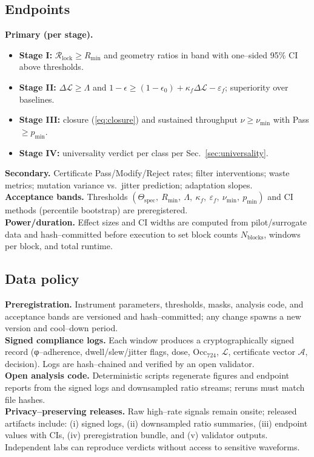 \documentclass[11pt]{article}
\begin{document}
\subsection{Endpoints}\label{sec:endpoints}
\textbf{Primary (per stage).}
\begin{itemize}
\item \textbf{Stage I:} $\mathcal{R}_{\mathrm{lock}}\ge R_{\min}$ and geometry ratios in band with one--sided 95\% CI above thresholds.
\item \textbf{Stage II:} $\Delta\mathcal{L}\ge\Lambda$ and $1-\epsilon\ge(1-\epsilon_0)+\kappa_f\Delta\mathcal{L}-\varepsilon_f$; superiority over baselines.
\item \textbf{Stage III:} closure (\eqref{eq:closure}) and sustained throughput $\nu\ge\nu_{\min}$ with \textsf{Pass}$\ge p_{\min}$.
\item \textbf{Stage IV:} universality verdict per class per Sec.~\ref{sec:universality}.
\end{itemize}
\textbf{Secondary.} Certificate \textsf{Pass/Modify/Reject} rates; filter interventions; waste metrics; mutation variance vs.\ jitter prediction; adaptation slopes.\\
\textbf{Acceptance bands.} Thresholds $(\Theta_{\mathrm{spec}},\ R_{\min},\ \Lambda,\ \kappa_f,\ \varepsilon_f,\ \nu_{\min},\ p_{\min})$ and CI methods (percentile bootstrap) are preregistered.\\
\textbf{Power/duration.} Effect sizes and CI widths are computed from pilot/surrogate data and hash--committed before execution to set block counts $N_{\mathrm{blocks}}$, windows per block, and total runtime.

\subsection{Data policy}\label{sec:datapolicy}
\textbf{Preregistration.} Instrument parameters, thresholds, masks, analysis code, and acceptance bands are versioned and hash--committed; any change spawns a new version and cool--down period.\\
\textbf{Signed compliance logs.} Each window produces a cryptographically signed record (φ–adherence, dwell/slew/jitter flags, dose, $\mathrm{Occ}_{724}$, $\mathcal{L}$, certificate vector $\mathcal{A}$, decision). Logs are hash--chained and verified by an open validator.\\
\textbf{Open analysis code.} Deterministic scripts regenerate figures and endpoint reports from the signed logs and downsampled ratio streams; reruns must match file hashes.\\
\textbf{Privacy--preserving releases.} Raw high--rate signals remain onsite; released artifacts include: (i) signed logs, (ii) downsampled ratio summaries, (iii) endpoint values with CIs, (iv) preregistration bundle, and (v) validator outputs. Independent labs can reproduce verdicts without access to sensitive waveforms.
\end{document}
